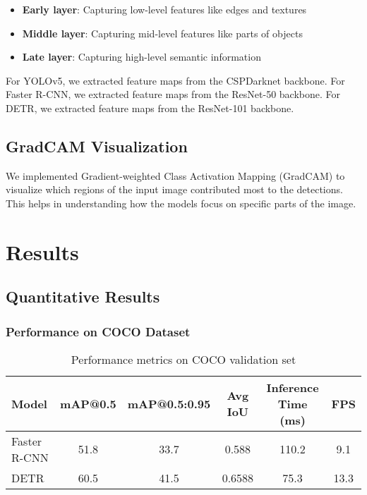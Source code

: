 \documentclass[12pt,a4paper]{article}
\begin{document}
\begin{itemize}
    \item \textbf{Early layer}: Capturing low-level features like edges and textures
    \item \textbf{Middle layer}: Capturing mid-level features like parts of objects
    \item \textbf{Late layer}: Capturing high-level semantic information
\end{itemize}

For YOLOv5, we extracted feature maps from the CSPDarknet backbone. For Faster R-CNN, we extracted feature maps from the ResNet-50 backbone. For DETR, we extracted feature maps from the ResNet-101 backbone.

\subsection{GradCAM Visualization}
We implemented Gradient-weighted Class Activation Mapping (GradCAM) to visualize which regions of the input image contributed most to the detections. This helps in understanding how the models focus on specific parts of the image.

\section{Results}
\subsection{Quantitative Results}
\subsubsection{Performance on COCO Dataset}

\begin{table}[H]
    \centering
    \caption{Performance metrics on COCO validation set}
    \label{tab:coco_results}
    \begin{tabular}{lccccc}
        \toprule
        \textbf{Model} & \textbf{mAP@0.5} & \textbf{mAP@0.5:0.95} & \textbf{Avg IoU} & \textbf{Inference Time (ms)} & \textbf{FPS} \\
        \midrule
        Faster R-CNN & 51.8 & 33.7 & 0.588 & 110.2 & 9.1 \\
        DETR & 60.5 & 41.5 & 0.6588 & 75.3 & 13.3 \\
        \bottomrule
    \end{tabular}
\end{table}
\end{document}
